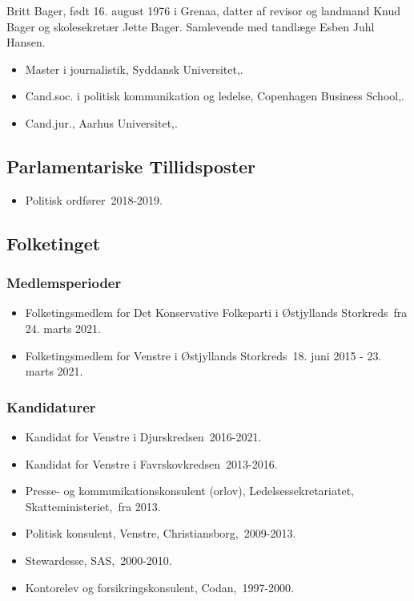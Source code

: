 \documentclass[11pt, a4paper]{awesome-cv}
\begin{document}
\makecvheader[R]
\makelettertitle
\begin{cvletter}
Britt Bager, født 16. august 1976 i Grenaa, datter af revisor og landmand Knud Bager og skolesekretær Jette Bager. Samlevende med tandlæge Esben Juhl Hansen.

\begin{itemize}
\item Master i journalistik, Syddansk Universitet,.
\item Cand.soc. i politisk kommunikation og ledelse, Copenhagen Business School,.
\item Cand.jur., Aarhus Universitet,.
\end{itemize}
\subsection*{Parlamentariske Tillidsposter}
\begin{itemize}
\item Politisk ordfører 2018-2019.
\end{itemize}
\subsection*{Folketinget}
\subsubsection*{Medlemsperioder}
\begin{itemize}
\item Folketingsmedlem for Det Konservative Folkeparti i Østjyllands Storkreds fra 24. marts 2021.
\item Folketingsmedlem for Venstre i Østjyllands Storkreds 18. juni 2015 - 23. marts 2021.
\end{itemize}
\subsubsection*{Kandidaturer}
\begin{itemize}
\item Kandidat for Venstre i Djurskredsen 2016-2021.
\item Kandidat for Venstre i Favrskovkredsen 2013-2016.
\end{itemize}
\begin{itemize}
\item Presse- og kommunikationskonsulent (orlov), Ledelsessekretariatet, Skatteministeriet, fra 2013.
\item Politisk konsulent, Venstre, Christiansborg, 2009-2013.
\item Stewardesse, SAS, 2000-2010.
\item Kontorelev og forsikringskonsulent, Codan, 1997-2000.
\end{itemize}
\end{cvletter}
\end{document}
